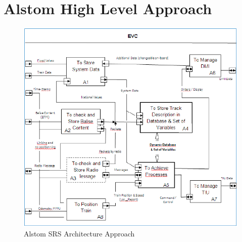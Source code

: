 \documentclass{template/openetcs_report}
\begin{document}
\chapter{Alstom High Level Approach}
 \begin{figure}[hbtp]
\centering
\includegraphics [scale=0.8] {images/Alstom_High_Level_Approach}
\caption{Alstom SRS Architecture Approach}
\end{figure}

\newpage

 
\appendix




\newpage
{}
\printindex

\end{document}
